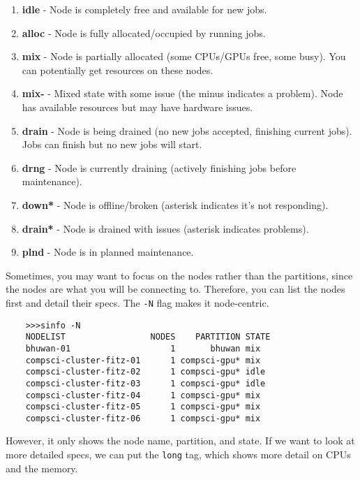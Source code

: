   \begin{definition}
    \begin{enumerate}
      \item \textbf{idle} - Node is completely free and available for new jobs.
      \item \textbf{alloc} - Node is fully allocated/occupied by running jobs.
      \item \textbf{mix} - Node is partially allocated (some CPUs/GPUs free, some busy). You can potentially get resources on these nodes.
      \item \textbf{mix-} - Mixed state with some issue (the minus indicates a problem). Node has available resources but may have hardware issues.
      \item \textbf{drain} - Node is being drained (no new jobs accepted, finishing current jobs). Jobs can finish but no new jobs will start.
      \item \textbf{drng} - Node is currently draining (actively finishing jobs before maintenance).
      \item \textbf{down*} - Node is offline/broken (asterisk indicates it's not responding).
      \item \textbf{drain*} - Node is drained with issues (asterisk indicates problems).
      \item \textbf{plnd} - Node is in planned maintenance.
    \end{enumerate}
  \end{definition} 

  Sometimes, you may want to focus on the nodes rather than the partitions, since the nodes are what you will be connecting to. Therefore, you can list the nodes first and detail their specs. The \texttt{-N} flag makes it node-centric. 

  \begin{lstlisting}
    >>>sinfo -N              
    NODELIST                 NODES    PARTITION STATE 
    bhuwan-01                    1       bhuwan mix   
    compsci-cluster-fitz-01      1 compsci-gpu* mix   
    compsci-cluster-fitz-02      1 compsci-gpu* idle  
    compsci-cluster-fitz-03      1 compsci-gpu* idle  
    compsci-cluster-fitz-04      1 compsci-gpu* mix   
    compsci-cluster-fitz-05      1 compsci-gpu* mix   
    compsci-cluster-fitz-06      1 compsci-gpu* mix   
  \end{lstlisting}

  However, it only shows the node name, partition, and state. If we want to look at more detailed specs, we can put the \texttt{long} tag, which shows more detail on CPUs and the memory. 

